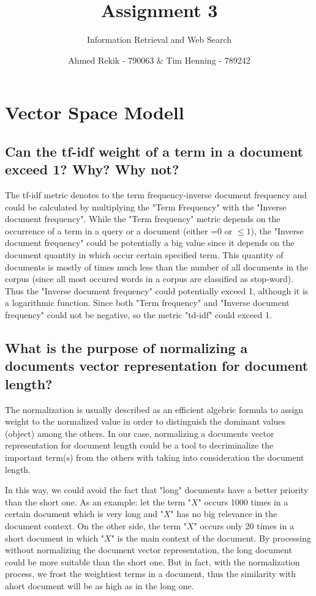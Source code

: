 \documentclass{scrartcl}
\title{Assignment 3}
\subtitle{Information Retrieval and Web Search}
\author{Ahmed Rekik - 790063 \& Tim Henning - 789242}
\begin{document}
\maketitle

\setcounter{section}{0}
\section{Vector Space Modell}

\subsection{Can the tf-idf weight of a term in a document exceed 1? Why? Why not? }

The tf-idf metric denotes to the term frequency-inverse document frequency and could be calculated by multiplying the "Term Frequency" with the "Inverse document frequency". While the "Term frequency" metric depends on the occurrence of a term in a query or a document (either =0 or $\leq 1$), the "Inverse document frequency" could be potentially a big value since it depends on the document quantity in which occur certain specified term. This quantity of documents is mostly of times much less than the number of all documents in the corpus (since all most occured words in a corpus are classified as stop-word). Thus the "Inverse document frequency" could potentially exceed 1, although it is a logarithmic function. Since both "Term frequency" and "Inverse document frequency" could not be negative, so the metric "td-idf" could exceed 1.



\subsection{What is the purpose of normalizing a documents vector representation for document length? }

The normalization is usually described as an efficient algebric formula to assign weight to the normalized value in order to distinguish the dominant values (object) among the others. In our case, normalizing a documents vector representation for document length could be a tool to decriminalize the important term(s) from the others with taking into consideration the document length.

 In this way, we could avoid the fact that "long" documents have a better priority than the short one. As an example: let the term "$X$" occurs 1000 times in a certain document which is very long and "$X$" has no big relevance in the document context. On the other side, the term "$X$" occurs only 20 times in a short document in which "$X$" is the main context of the document. By processing without normalizing the document vector representation, the long document could be more suitable than the short one. But in fact, with the normalization process, we frost the weightiest terms in a document, thus the similarity with ahort document will be as high as in the long one.
\end{document}
